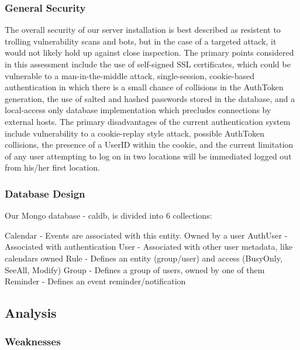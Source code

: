 \documentclass{article}
\begin{document}
\subsubsection{General Security}

    The overall security of our server installation is best described as resistent to trolling vulnerability scans and bots, but in the case of a targeted attack, it would not likely hold up against close inspection. The primary points considered in this assessment include the use of self-signed SSL certificates, which could be vulnerable to a man-in-the-middle attack, single-session, cookie-based authentication in which there is a small chance of collisions in the AuthToken generation, the use of salted and hashed passwords stored in the database, and a local-access only database implementation which precludes connections by external hosts. The primary disadvantages of the current authentication system include vulnerability to a cookie-replay style attack, possible AuthToken collisions, the presence of a UserID within the cookie, and the current limitation of any user attempting to log on in two locations will be immediated logged out from his/her first location.

\subsubsection{Database Design}
Our Mongo database - caldb, is divided into 6 collections:

Calendar - Events are associated with this entity. Owned by a user
AuthUser - Associated with authentication
User - Associated with other user metadata, like calendars owned
Rule - Defines an entity (group/user) and access (BusyOnly, SeeAll, Modify)
Group - Defines a group of users, owned by one of them
Reminder - Defines an event reminder/notification

\subsection{Analysis}

\subsubsection{Weaknesses}
\end{document}
